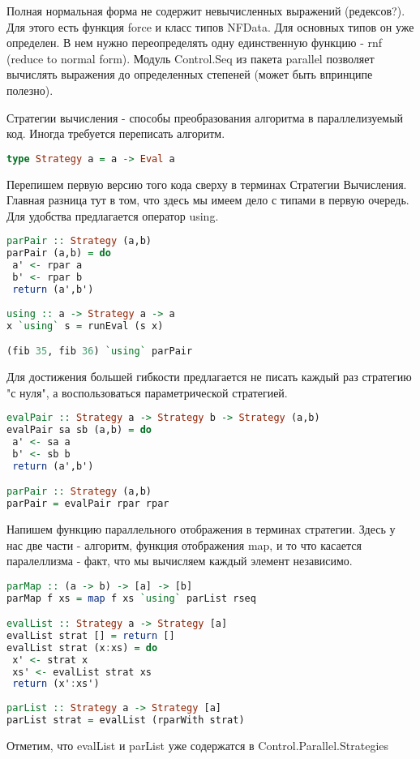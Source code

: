 \documentclass[10pt,a4paper]{article}
\begin{document}
Полная нормальная форма не содержит невычисленных выражений (редексов?). Для этого есть функция force и класс типов NFData. Для основных типов он уже определен. В нем нужно переопределять одну единственную функцию - rnf (reduce to normal form). Модуль Control.Seq из пакета parallel позволяет вычислять выражения до определенных степеней (может быть впринципе полезно).

Стратегии вычисления - способы преобразования алгоритма в параллелизуемый код. Иногда требуется переписать алгоритм. 

\begin{lstlisting}[language=Haskell]
type Strategy a = a -> Eval a
\end{lstlisting}

Перепишем первую версию того кода сверху в терминах Стратегии Вычисления. Главная разница тут в том, что здесь мы имеем дело с типами в первую очередь. Для удобства предлагается оператор using.

\begin{lstlisting}[language=Haskell]
parPair :: Strategy (a,b)
parPair (a,b) = do
 a' <- rpar a
 b' <- rpar b
 return (a',b')
 
using :: a -> Strategy a -> a
x `using` s = runEval (s x)

(fib 35, fib 36) `using` parPair
\end{lstlisting}

Для достижения большей гибкости предлагается не писать каждый раз стратегию "с нуля", а воспользоваться параметрической стратегией.

\begin{lstlisting}[language=Haskell]
evalPair :: Strategy a -> Strategy b -> Strategy (a,b)
evalPair sa sb (a,b) = do
 a' <- sa a
 b' <- sb b
 return (a',b')

parPair :: Strategy (a,b)
parPair = evalPair rpar rpar
\end{lstlisting}

Напишем функцию параллельного отображения в терминах стратегии. Здесь у нас две части - алгоритм, функция отображения map, и то что касается паралеллизма - факт, что мы вычисляем каждый элемент независимо.

\begin{lstlisting}[language=Haskell]
parMap :: (a -> b) -> [a] -> [b]
parMap f xs = map f xs `using` parList rseq

evalList :: Strategy a -> Strategy [a]
evalList strat [] = return []
evalList strat (x:xs) = do
 x' <- strat x
 xs' <- evalList strat xs
 return (x':xs')
 
parList :: Strategy a -> Strategy [a]
parList strat = evalList (rparWith strat)
\end{lstlisting}

Отметим, что evalList и parList уже содержатся в Control.Parallel.Strategies
\end{document}
